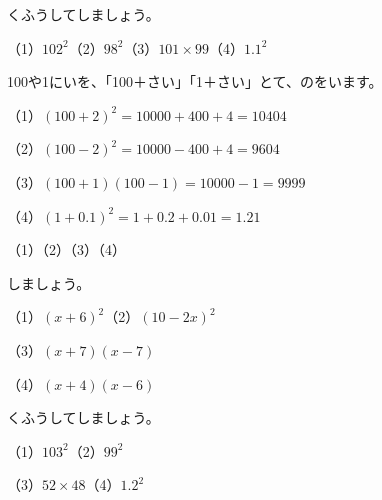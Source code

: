 \begin{reidai}[\R{展開}{てん|かい}で、くふうして\R{計算}{けい|さん}する]
くふうしてしましょう。\par
（1）$102^2$\qquad（2）$98^2$\qquad（3）$101\times99$\qquad（4）$1.1^2$\par
\kangaekata 100や1にいを、「100＋さい」「1＋さい」とて、のをいます。\par
\shiki（1）\nobreak $(100+2)^2=10000+400+4=10404$\par
\hspace*{2.6\zw}（2）\nobreak $(100-2)^2=10000-400+4=9604$\par
\hspace*{2.6\zw}（3）\nobreak $(100+1)(100-1)=10000-1=9999$\par
\hspace*{2.6\zw}（4）\nobreak $(1+0.1)^2=1+0.2+0.01=1.21$\par
\kotae（1）\qquad（2）\qquad（3）\qquad（4）
\end{reidai}

\begingroup{}%
\noindent\begin{minipage}[t]{0.49\linewidth}
\begin{jibun}
しましょう。\par
（1）$(x+6)^2$\quad（2）$(10-2x)^2$\par
（3）$(x+7)(x-7)$\par
（4）$(x+4)(x-6)$
\end{jibun}
\end{minipage}\hfill
\begin{minipage}[t]{0.49\linewidth}
\begin{jibun}
くふうしてしましょう。\par
（1）$103^2$\quad（2）$99^2$\par
（3）$52\times48$\quad（4）$1.2^2$
\end{jibun}
\end{minipage}\par
\endgroup

